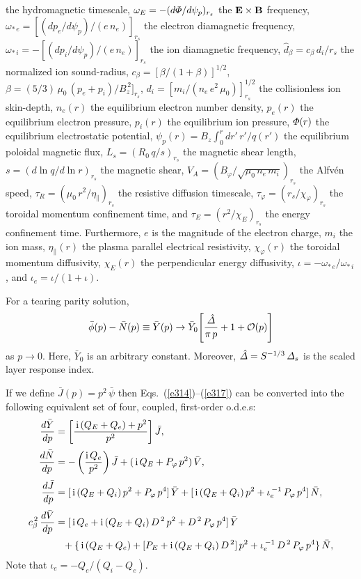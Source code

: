 \documentclass[12pt,prb,aps]{revtex4-1}
\providecommand{\DIFadd}[1]{{\protect\color{blue}\uwave{#1}}} %
\providecommand{\DIFdel}[1]{{\protect\color{red}\sout{#1}}}                      %
\providecommand{\DIFaddbegin}{} %
\providecommand{\DIFaddend}{} %
\providecommand{\DIFdelbegin}{} %
\providecommand{\DIFdelend}{} %
\begin{document}
the hydromagnetic timescale, $\omega_E=-(d{\mit\Phi}/d\psi_p)_{r_s}$ the ${\bf E}\times {\bf B}$ frequency, $\omega_{\ast\,e}=[(dp_e/d\psi_p)/(e\,n_e)]_{r_s}$
the electron diamagnetic frequency, $\omega_{\ast\,i} = - [(dp_i/d\psi_p)/(e\,n_e)]_{r_s}$ the ion diamagnetic frequency, 
$\hat{d}_\beta =c_\beta\,d_i/r_s$ the normalized ion sound-radius, $c_\beta=[\beta/(1+\beta)]^{1/2}$, $\beta=(5/3)\,\mu_0\,(p_e+p_i)/B_z^{\,2}]_{r_s}$,  
$d_i= [m_i/(n_e\,e^2\,\mu_0)]^{1/2}_{r_s}$ the collisionless ion skin-depth, 
$n_e(r)$ the equilibrium electron number density, $p_e(r)$ the equilibrium electron pressure, $p_i(r)$ the equilibrium ion pressure, ${\mit\Phi}(r)$ the equilibrium 
electrostatic potential, $\psi_p(r)= B_z \int_0^r dr'\,r'/q(r')$ the equilibrium poloidal magnetic flux, 
$L_s=(R_0\,q/s)_{r_s}$ the magnetic shear length, $s=(d\ln q/d\ln r)_{r_s}$ the magnetic shear, $V_A=(B_\varphi/\sqrt{\mu_0\,n_e\,m_i})_{r_s}$ the Alfv\'{e}n speed,
$\tau_R= (\mu_0\,r^2/\eta_\parallel)_{r_s}$ the resistive diffusion timescale, \DIFdelbegin \DIFdel{$\tau_\varphi= (r_s/\chi_\varphi)_{r_s}$ }\DIFdelend \DIFaddbegin \DIFadd{$\tau_\varphi= (r^2/\chi_\varphi)_{r_s}$ }\DIFaddend the toroidal momentum confinement
time, and $\tau_E=(r^2/\chi_E)_{r_s}$ the energy confinement time. Furthermore, $e$ is the magnitude of the electron charge, $m_i$ the ion mass,
$\eta_\parallel(r)$ the plasma parallel electrical resistivity, $\chi_\varphi(r)$ the toroidal momentum diffusivity, $\chi_E(r)$ the perpendicular  energy diffusivity,  $\iota=-\omega_{\ast\,e}/\omega_{\ast\,i}$, 
and $\iota_e=\iota/(1+\iota)$. 

For a tearing parity solution, 
\begin{equation}\label{e41}
\bar{\phi}(p)-\bar{N}(p)\equiv\bar{Y} (p)\rightarrow \bar{Y}_0\!\left[\frac{\hat{\mit\Delta}}{\pi\,p} + 1+ {\cal O}(p)\right]
\end{equation}
as $p\rightarrow 0$. Here,  $\bar{Y}_0$ is an arbitrary constant. Moreover, $\hat{\mit\Delta}= S^{-1/3}\,{\mit\Delta}_s$ is the scaled
layer response index. 

If we define  $\bar{J}(p)= p^2\,\bar{\psi}$ 
then Eqs.~(\ref{e314})--(\ref{e317}) can be converted into the following equivalent set of four, coupled, first-order o.d.e.s:
\begin{align}\label{e1}
\frac{d\bar{Y}}{dp} &= \left[\frac{\,{\rm i}\,(Q_E+Q_e)+p^2}{p^2}\right]\bar{J},\\[0.5ex]
\frac{d\bar{N}}{dp} &= -\left(\frac{{\rm i}\,Q_e}{p^2}\right)\bar{J} + (\,{\rm i}\,Q_E + P_\varphi\,p^2)\,\bar{V},\\[0.5ex]
\frac{d\bar{J}}{dp} &= [\,{\rm i}\,(Q_E+Q_i)\,p^2 + P_\varphi\,p^4]\,\bar{Y}
+ [\,{\rm i}\,(Q_E+Q_i)\,p^2 + \iota_e^{\,-1}\,P_\varphi\,p^4]\,\bar{N},\\[0.5ex]
c_\beta^{\,2}\,\frac{d\bar{V}}{dp} &= [\,{\rm i}\,Q_e+ {\rm i}\,(Q_E+Q_i)\,D^{\,2}\,p^2 + D^{\,2}\,P_\varphi\,p^4]\,\bar{Y}
\nonumber\\[0.5ex]&\phantom{=} +\{\,{\rm i}\,(Q_E+Q_e) + [P_E+{\rm i}\,(Q_E + Q_i) \,D^{\,2}]\,p^2 + \iota_e^{\,-1}\,D^{\,2}\,P_\varphi\,p^4\}\,\bar{N},\label{e4}
\end{align}
Note that $\iota_e= -Q_e/(Q_i-Q_e)$. 
\end{document}

